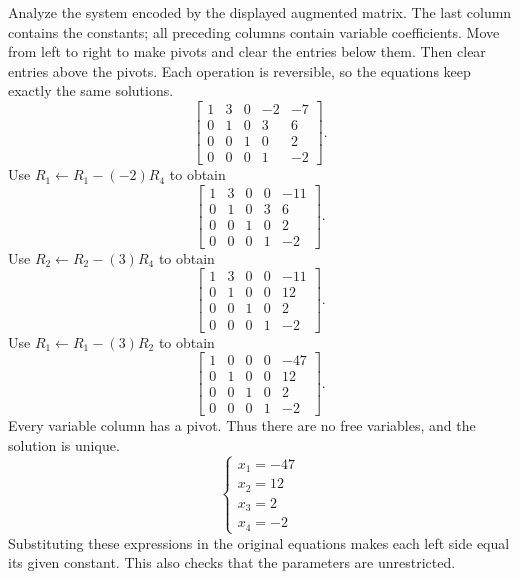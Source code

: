 \goal Analyze the system encoded by the displayed augmented matrix. The last column contains the constants; all preceding columns contain variable coefficients.
\idea Move from left to right to make pivots and clear the entries below them. Then clear entries above the pivots. Each operation is reversible, so the equations keep exactly the same solutions.
\[ \left[\begin{array}{rrrr|r}1&3&0&-2&-7\\0&1&0&3&6\\0&0&1&0&2\\0&0&0&1&-2\end{array}\right].\]
Use $R_{1}\leftarrow R_{1}-(-2)R_{4}$ to obtain
\[ \left[\begin{array}{rrrr|r}1&3&0&0&-11\\0&1&0&3&6\\0&0&1&0&2\\0&0&0&1&-2\end{array}\right].\]
Use $R_{2}\leftarrow R_{2}-(3)R_{4}$ to obtain
\[ \left[\begin{array}{rrrr|r}1&3&0&0&-11\\0&1&0&0&12\\0&0&1&0&2\\0&0&0&1&-2\end{array}\right].\]
Use $R_{1}\leftarrow R_{1}-(3)R_{2}$ to obtain
\[ \left[\begin{array}{rrrr|r}1&0&0&0&-47\\0&1&0&0&12\\0&0&1&0&2\\0&0&0&1&-2\end{array}\right].\]
Every variable column has a pivot. Thus there are no free variables, and the solution is unique.
\[ \begin{cases}x_{1}=-47\\x_{2}=12\\x_{3}=2\\x_{4}=-2\end{cases}\]
Substituting these expressions in the original equations makes each left side equal its given constant. This also checks that the parameters are unrestricted.

